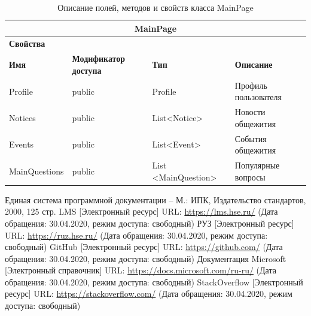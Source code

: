 \documentclass{../includes/TechDoc}
\begin{document}
    \begin{table}[ht]
        \caption{\label{tab:class-mainpagemodel-table}Описание полей, методов и свойств класса MainPage}
        \centering
        \begin{tabular}{|p{3.2cm}|p{3cm}|p{3cm}|p{2.6cm}|p{4cm}|}
            \hline
            \multicolumn{5}{|c|}{MainPage} \\ \hline
            \multicolumn{5}{|l|}{\textbf{Свойства}} \\ \hline
            \textbf{Имя} & \textbf{Модификатор доступа} & \textbf{Тип} & \multicolumn{2}{l|}{\textbf{Описание}} \\ \hline
            Profile & public & Profile & \multicolumn{2}{l|}{Профиль пользователя} \\ \hline
            Notices & public & List<Notice> & \multicolumn{2}{l|}{Новости общежития} \\ \hline
            Events & public & List<Event> & \multicolumn{2}{l|}{События общежития} \\ \hline
            MainQuestions & public & List <MainQuestion> & \multicolumn{2}{l|}{Популярные вопросы} \\ \hline
        \end{tabular}
    \end{table}

    \newpage


    \begin{thebibliography}{3}
        Единая система программной документации – М.: ИПК, Издательство стандартов, 2000, 125 стр.
         LMS [Электронный ресурс] URL: \url{https://lms.hse.ru/} (Дата обращения: 30.04.2020, режим доступа: свободный)
         РУЗ [Электронный ресурс] URL: \url{https://ruz.hse.ru/} (Дата обращения: 30.04.2020, режим доступа: свободный)
         GitHub [Электронный ресурс] URL: \url{https://github.com/} (Дата обращения: 30.04.2020, режим доступа: свободный)
         Документация Microsoft [Электронный справочник] URL: \url{https://docs.microsoft.com/ru-ru/} (Дата обращения: 30.04.2020, режим доступа: свободный)
         StackOverflow [Электронный ресурс] URL: \url{https://stackoverflow.com/} (Дата обращения: 30.04.2020, режим доступа: свободный)
    \end{thebibliography}


    \registrationList
\end{document}
